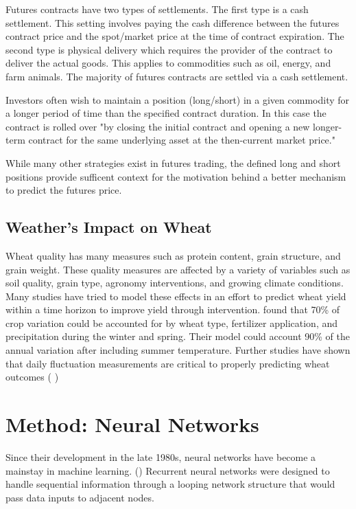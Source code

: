 \documentclass[twoside,11pt]{article}
\begin{document}
  Futures contracts have two types of settlements. The first type is a cash settlement. This setting involves paying the cash difference between the futures contract price and the spot/market price at the time of contract expiration. The second type is physical delivery which requires the provider of the contract to deliver the actual goods. This applies to commodities such as oil, energy, and farm animals. The majority of futures contracts are settled via a cash settlement.
  
  Investors often wish to maintain a position (long/short) in a given commodity for a longer period of time than the specified contract duration. In this case the contract is rolled over "by closing the initial contract and opening a new longer-term contract for the same underlying asset at the then-current market price." \cite{InvestopediaRF}

  While many other strategies exist in futures trading, the defined long and short positions provide sufficent context for the motivation behind a better mechanism to predict the futures price.
% 
\subsection{Weather's Impact on Wheat}
	
	Wheat quality has many measures such as protein content, grain structure, and grain weight. These quality measures are affected by a variety of variables such as soil quality, grain type, agronomy interventions, and growing climate conditions. Many studies have tried to model these effects in an effort to predict wheat yield within a time horizon to improve yield through intervention. \cite{Gooding2017} found that 70\% of crop variation could be accounted for by wheat type, fertilizer application, and precipitation during the winter and spring. Their model could account 90\% of the annual variation after including summer temperature. Further studies have shown that daily fluctuation measurements are critical to properly predicting wheat outcomes (\cite{Nuttall2017} \cite{Mearns1996})
	
\section{Method: Neural Networks} \label{model}

Since their development in the late 1980s, neural networks have become a mainstay in machine learning. (\cite{Schmidhuber2015}) Recurrent neural networks were designed to handle sequential information through a looping network structure that would pass data inputs to adjacent nodes. 
\end{document}
